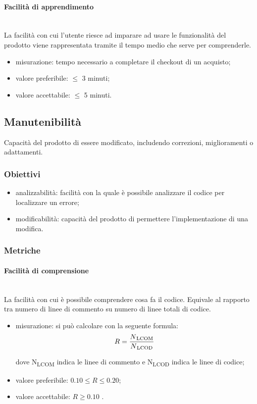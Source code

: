 			\paragraph{Facilità di apprendimento}\mbox{}\\
			La facilità con cui l'utente riesce ad imparare ad usare le funzionalità del prodotto viene rappresentata tramite il tempo medio che serve per comprenderle.
			\begin{itemize}
			\item misurazione: tempo necessario a completare il checkout di un acquisto;
			\item valore preferibile: $\leq$ 3 minuti;
			\item valore accettabile: $\leq$ 5 minuti.
			\end{itemize}
		
	\subsection{Manutenibilità}
	Capacità del prodotto di essere modificato, includendo correzioni, miglioramenti o adattamenti.
		\subsubsection{Obiettivi}
		\begin{itemize}
			\item analizzabilità: facilità con la quale è possibile analizzare il codice per localizzare un errore;
			\item modificabilità: capacità del prodotto di permettere l'implementazione di una modifica.
		\end{itemize}
		\subsubsection{Metriche}
			\paragraph{Facilità di comprensione}\mbox{}\\
			La facilità con cui è possibile comprendere cosa fa il codice. Equivale al rapporto tra numero di linee di commento su numero di linee totali di codice. %
			\begin{itemize}
			\item misurazione: si può calcolare con la seguente formula: \\
			$$ R = \frac{N\textsubscript{LCOM}}{N\textsubscript{LCOD}}  $$
		
			dove N\textsubscript{LCOM} indica le linee di commento e N\textsubscript{LCOD} indica le linee di codice;
			\item valore preferibile: $0.10 \leq R \leq 0.20$;
			\item valore accettabile: $R \geq 0.10$ .
			\end{itemize}
